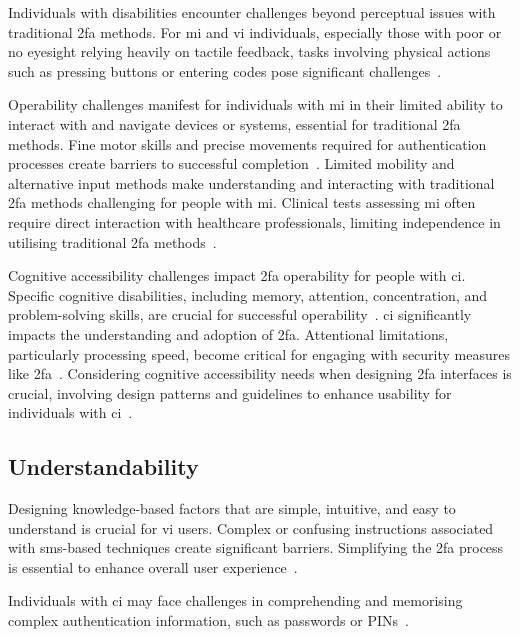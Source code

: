 Individuals with disabilities encounter challenges beyond perceptual issues with traditional \ac{2fa} methods. For \ac{mi} and \ac{vi} individuals, especially those with poor or no eyesight relying heavily on tactile feedback, tasks involving physical actions such as pressing buttons or entering codes pose significant challenges~\cite{kumar_2019}.

Operability challenges manifest for individuals with \ac{mi} in their limited ability to interact with and navigate devices or systems, essential for traditional \ac{2fa} methods. Fine motor skills and precise movements required for authentication processes create barriers to successful completion~\cite{rajavenkatanarayanan_2019}. Limited mobility and alternative input methods make understanding and interacting with traditional \ac{2fa} methods challenging for people with \ac{mi}. Clinical tests assessing \ac{mi} often require direct interaction with healthcare professionals, limiting independence in utilising traditional \ac{2fa} methods~\cite{rajavenkatanarayanan_2019}.

Cognitive accessibility challenges impact \ac{2fa} operability for people with \ac{ci}. Specific cognitive disabilities, including memory, attention, concentration, and problem-solving skills, are crucial for successful operability~\cite{erinola_2023}. \Ac{ci} significantly impacts the understanding and adoption of \ac{2fa}. Attentional limitations, particularly processing speed, become critical for engaging with security measures like \ac{2fa}~\cite{moreno_2023,neupert_2021}. Considering cognitive accessibility needs when designing \ac{2fa} interfaces is crucial, involving design patterns and guidelines to enhance usability for individuals with \ac{ci}~\cite{moreno_2023}.

\subsection{Understandability}
\label{sec:challenges:understandability}

Designing knowledge-based factors that are simple, intuitive, and easy to understand is crucial for \ac{vi} users. Complex or confusing instructions associated with \acs{sms}-based techniques create significant barriers. Simplifying the \ac{2fa} process is essential to enhance overall user experience~\cite{chen_2015}.

Individuals with \ac{ci} may face challenges in comprehending and memorising complex authentication information, such as passwords or PINs~\cite{erinola_2023}.

